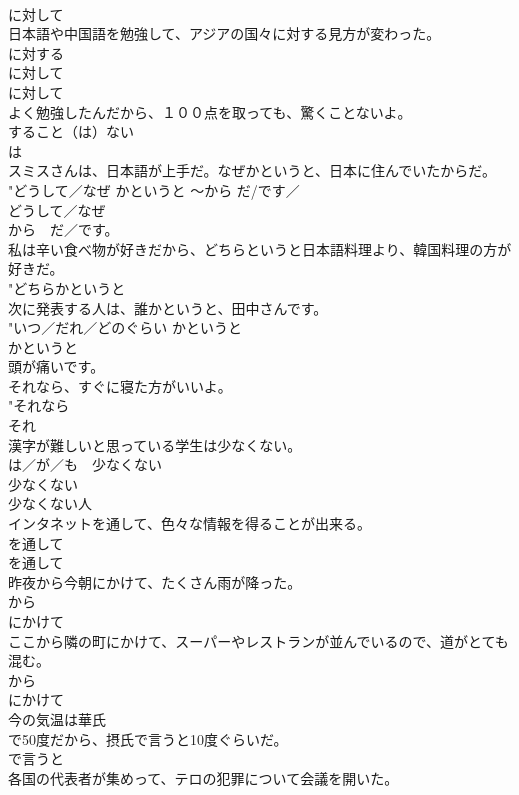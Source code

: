 \documentclass[8pt]{extreport}
\begin{document}
\begin{CJK}{UTF8}{min}
{\\	に対して 
\\	日本語や中国語を勉強して、アジアの国々に対する見方が変わった。	
\\	に対する 
\\	に対して 
\\	に対して 
\\	よく勉強したんだから、１００点を取っても、驚くことないよ。	
\\	すること（は）ない 
\\	は 
\\	スミスさんは、日本語が上手だ。なぜかというと、日本に住んでいたからだ。	
\\	"{どうして／なぜ} かというと 〜から {だ/です／
\\	どうして／なぜ 
\\	から　だ／です。
\\	私は辛い食べ物が好きだから、どちらというと日本語料理より、韓国料理の方が好きだ。	
\\	"どちらかというと 
\\	次に発表する人は、誰かというと、田中さんです。	
\\	"{いつ／だれ／どのぐらい} かというと 
\\	かというと 
\\	頭が痛いです。 
\\	それなら、すぐに寝た方がいいよ。	
\\	"それなら 
\\	それ 
\\	漢字が難しいと思っている学生は少なくない。	
\\	{は／が／も}　少なくない 
\\	少なくない 
\\	少なくない人 
\\	インタネットを通して、色々な情報を得ることが出来る。	
\\	を通して 
\\	を通して 
\\	昨夜から今朝にかけて、たくさん雨が降った。	
\\	から 
\\	にかけて 
\\	ここから隣の町にかけて、スーパーやレストランが並んでいるので、道がとても混む。	
\\	から 
\\	にかけて 
\\	今の気温は華氏 
\\	で50度だから、摂氏で言うと10度ぐらいだ。	
\\	で言うと 
\\	各国の代表者が集めって、テロの犯罪について会議を開いた。	
}}
\end{CJK}
\end{document}
